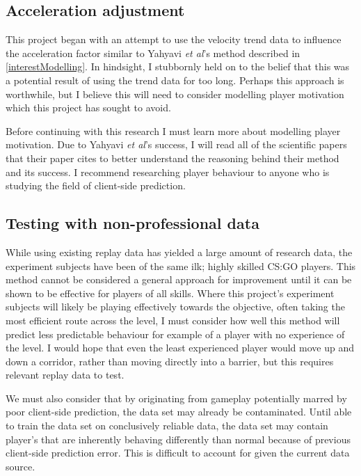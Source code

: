 \documentclass[journal]{IEEEtran}
\begin{document}
\subsection{Acceleration adjustment}

This project began with an attempt to use the velocity trend data to influence the acceleration factor similar to Yahyavi \textit{et al}'s method described in \ref{interestModelling}. In hindsight, I stubbornly held on to the belief that this was a potential result of using the trend data for too long. Perhaps this approach is worthwhile, but I believe this will need to consider modelling player motivation which this project has sought to avoid.

Before continuing with this research I must learn more about modelling player motivation. Due to Yahyavi \textit{et al}'s success, I will read all of the scientific papers that their paper cites to better understand the reasoning behind their method and its success. I recommend researching player behaviour to anyone who is studying the field of client-side prediction.

\subsection{Testing with non-professional data}

While using existing replay data has yielded a large amount of research data, the experiment subjects have been of the same ilk; highly skilled CS:GO players. This method cannot be considered a general approach for improvement until it can be shown to be effective for players of all skills. Where this project's experiment subjects will likely be playing effectively towards the objective, often taking the most efficient route across the level, I must consider how well this method will predict less predictable behaviour for example of a player with no experience of the level. I would hope that even the least experienced player would move up and down a corridor, rather than moving directly into a barrier, but this requires relevant replay data to test.

We must also consider that by originating from gameplay potentially marred by poor client-side prediction, the data set may already be contaminated. Until able to train the data set on conclusively reliable data, the data set may contain player's that are inherently behaving differently than normal because of previous client-side prediction error. This is difficult to account for given the current data source.
\end{document}
